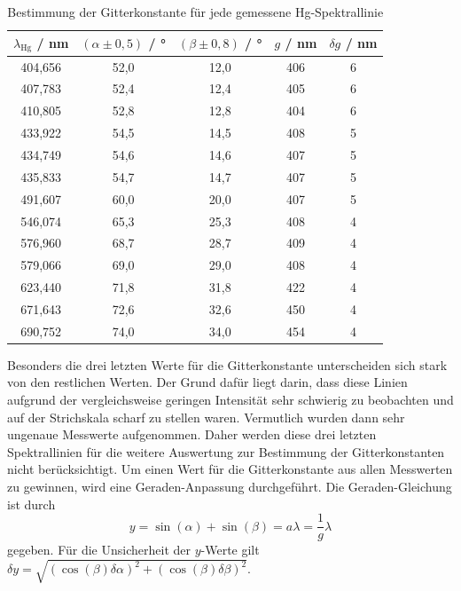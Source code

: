 \begin{table}[H]
    \centering
    \caption{Bestimmung der Gitterkonstante für jede gemessene Hg-Spektrallinie}
    \begin{tabular}{c|c|c|c|c}
        $\lambda_{\mathrm{Hg}}$ / \unit{\nano \meter} & $(\alpha \pm 0,5)$ / \unit{\degree} & $(\beta \pm 0,8)$ / \unit{\degree} & $g$ / \unit{\nano \meter} & $\delta g$ / \unit{\nano \meter} \\
        \hline
        404,656 & 52,0 & 12,0 & 406 & 6 \\
        407,783 & 52,4 & 12,4 & 405 & 6 \\
        410,805 & 52,8 & 12,8 & 404 & 6 \\
        433,922 & 54,5 & 14,5 & 408 & 5 \\
        434,749 & 54,6 & 14,6 & 407 & 5 \\
        435,833 & 54,7 & 14,7 & 407 & 5 \\
        491,607 & 60,0 & 20,0 & 407 & 5 \\
        546,074 & 65,3 & 25,3 & 408 & 4 \\
        576,960 & 68,7 & 28,7 & 409 & 4 \\
        579,066 & 69,0 & 29,0 & 408 & 4 \\
        623,440 & 71,8 & 31,8 & 422 & 4 \\
        671,643 & 72,6 & 32,6 & 450 & 4 \\
        690,752 & 74,0 & 34,0 & 454 & 4
    \end{tabular}\label{tab:gitterkonstanten}
\end{table} Besonders die drei letzten Werte für die Gitterkonstante unterscheiden sich stark von den restlichen Werten. Der Grund dafür liegt darin, dass diese Linien
aufgrund der vergleichsweise geringen Intensität sehr schwierig zu beobachten und auf der Strichskala scharf zu stellen waren. Vermutlich wurden dann sehr ungenaue Messwerte
aufgenommen. Daher werden diese drei letzten Spektrallinien für die weitere Auswertung zur Bestimmung der Gitterkonstanten nicht berücksichtigt.\newline
\indent Um einen Wert für die Gitterkonstante aus allen Messwerten zu gewinnen, wird eine Geraden-Anpassung durchgeführt. Die Geraden-Gleichung ist durch
\begin{equation*}
    y = \sin(\alpha) + \sin(\beta) = a \lambda = \frac{1}{g} \lambda
\end{equation*} gegeben. Für die Unsicherheit der $y$-Werte gilt $\delta y = \sqrt{(\cos(\beta) \delta \alpha)^2 + (\cos(\beta) \delta \beta)^2}$.
